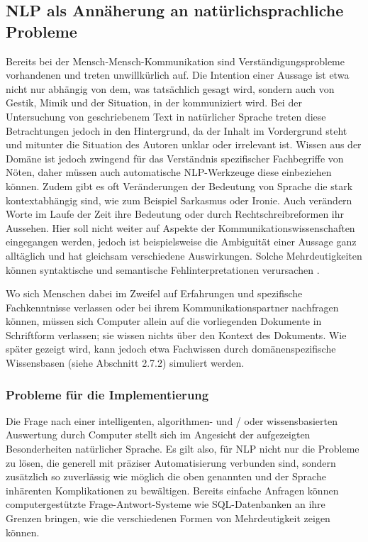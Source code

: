 \documentclass[12pt]{report}
\begin{document}
\subsection{NLP als Annäherung an natürlichsprachliche Probleme}
Bereits bei der Mensch-Mensch-Kommunikation sind  Verständigungsprobleme vorhandenen und treten unwillkürlich auf. Die Intention einer Aussage ist etwa nicht nur abhängig von dem, was tatsächlich gesagt wird, sondern auch von Gestik, Mimik und der Situation, in der kommuniziert wird. Bei der Untersuchung von geschriebenem Text in natürlicher Sprache treten diese Betrachtungen jedoch in den Hintergrund, da der Inhalt im Vordergrund steht und mitunter die Situation des Autoren unklar oder irrelevant ist. Wissen aus der Domäne ist jedoch zwingend für das Verständnis spezifischer Fachbegriffe von Nöten, daher müssen auch automatische NLP-Werkzeuge diese einbeziehen können. Zudem gibt es oft Veränderungen der Bedeutung von Sprache die stark kontextabhängig sind, wie zum Beispiel Sarkasmus oder Ironie. Auch verändern Worte im Laufe der Zeit ihre Bedeutung oder durch Rechtschreibreformen ihr Aussehen. Hier soll nicht weiter auf Aspekte der Kommunikationswissenschaften eingegangen werden, jedoch ist beispielsweise die Ambiguität einer Aussage ganz alltäglich und hat gleichsam verschiedene Auswirkungen. Solche Mehrdeutigkeiten können syntaktische und semantische Fehlinterpretationen verursachen \cite{wei89}.

Wo sich Menschen dabei im Zweifel auf Erfahrungen und spezifische Fachkenntnisse verlassen oder bei ihrem Kommunikationspartner nachfragen können, müssen sich Computer allein auf die vorliegenden Dokumente in Schriftform verlassen; sie wissen nichts über den Kontext des Dokuments. Wie später gezeigt wird, kann jedoch etwa Fachwissen durch domänenspezifische Wissensbasen (siehe Abschnitt 2.7.2) simuliert werden. 
\subsubsection{Probleme für die Implementierung}

Die Frage nach einer intelligenten, algorithmen- und / oder wissensbasierten Auswertung durch Computer stellt sich im Angesicht der aufgezeigten Besonderheiten natürlicher Sprache. Es gilt also, für NLP nicht nur die Probleme zu lösen, die generell mit präziser Automatisierung verbunden sind, sondern zusätzlich so zuverlässig wie möglich die oben genannten und der Sprache inhärenten Komplikationen zu bewältigen. 
Bereits einfache Anfragen können computergestützte Frage-Antwort-Systeme wie SQL-Datenbanken an ihre Grenzen bringen, wie die verschiedenen Formen von Mehrdeutigkeit zeigen können.
\end{document}
